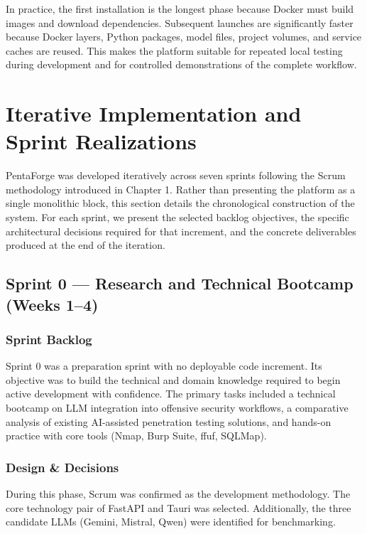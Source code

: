 \documentclass[12pt,a4paper]{report}
\begin{document}
In practice, the first installation is the longest phase because Docker must build
images and download dependencies. Subsequent launches are significantly faster because
Docker layers, Python packages, model files, project volumes, and service caches are
reused. This makes the platform suitable for repeated local testing during development
and for controlled demonstrations of the complete workflow.

\section{Iterative Implementation and Sprint Realizations}

PentaForge was developed iteratively across seven sprints following the Scrum methodology introduced in Chapter 1. Rather than presenting the platform as a single monolithic block, this section details the chronological construction of the system. For each sprint, we present the selected backlog objectives, the specific architectural decisions required for that increment, and the concrete deliverables produced at the end of the iteration.

\subsection{Sprint 0 --- Research and Technical Bootcamp (Weeks 1--4)}

\subsubsection{Sprint Backlog}
Sprint 0 was a preparation sprint with no deployable code increment. Its objective was to build the technical and domain knowledge required to begin active development with confidence. The primary tasks included a technical bootcamp on LLM integration into offensive security workflows, a comparative analysis of existing AI-assisted penetration testing solutions, and hands-on practice with core tools (Nmap, Burp Suite, ffuf, SQLMap).

\subsubsection{Design \& Decisions}
During this phase, Scrum was confirmed as the development methodology. The core technology pair of FastAPI and Tauri was selected. Additionally, the three candidate LLMs (Gemini, Mistral, Qwen) were identified for benchmarking.
\end{document}
